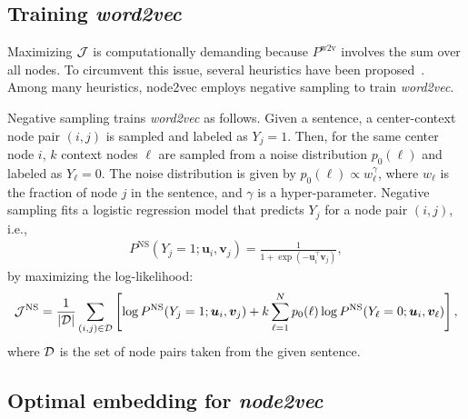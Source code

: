 \documentclass[12pt]{article} %
\def\ie{i.e.,~}
\def\vec#1{{\bm #1}}
\begin{document}
\subsection{Training \textit{word2vec}}
\label{sec:training}

Maximizing ${\cal J}$ is computationally demanding because $P^{\text{w2v}}$ involves the sum over all nodes.
To circumvent this issue, several heuristics have been proposed~\cite{Mikolov2013,Perozzi2014,Grover2016}.
Among many heuristics, node2vec employs negative sampling to train \textit{word2vec}.

Negative sampling trains \textit{word2vec} as follows.
Given a sentence, a center-context node pair $(i,j)$ is sampled and labeled as $Y_j=1$.
Then, for the same center node $i$, $k$ context nodes $\ell$ are sampled from a noise distribution $p_0(\ell)$ and labeled as $Y_{\ell}=0$.
The noise distribution is given by $p_0(\ell) \propto w^\gamma _\ell$, where $w_\ell$ is the fraction of node $j$ in the sentence, and $\gamma$ is a hyper-parameter.
Negative sampling fits a logistic regression model that predicts $Y_j$ for a node pair $(i,j)$, \ie
\begin{align}
    \label{eq:logistic-regress}
    P^{\text{NS}}(Y_{j} = 1; \vec{u}_{i}, \vec{v}_j) = \frac{1}{1 + \exp(-\vec{u}_i ^\top \vec{v}_{j})},
\end{align}
by maximizing the log-likelihood:
\begin{align}
    \label{eq:log-likelihood-logistic-regress}
    {\cal J}^{\text{NS}} = \frac{1}{|{\cal D}|}\sum_{(i,j) \in {\cal D}} \left[ \log P^{\text{NS}}(Y_{j} = 1; \vec{u}_{i}, \vec{v}_j) + k\sum_{\ell=1}^N p_0(\ell) \log P^{\text{NS}}(Y_{\ell} = 0; \vec{u}_{i}, \vec{v}_\ell)\right],
\end{align}
where ${\cal D}$ is the set of node pairs taken from the given sentence.

\subsection{Optimal embedding for \textit{node2vec}}
\end{document}
